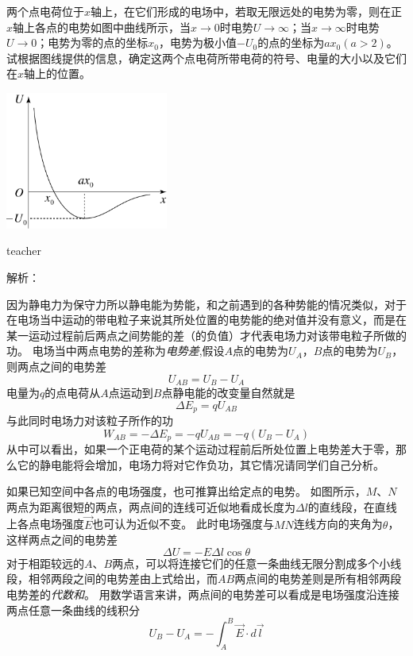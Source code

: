 \begin{example}
两个点电荷位于$x$轴上，在它们形成的电场中，若取无限远处的电势为零，则在正$x$轴上各点的电势如图中曲线所示，当$x\rightarrow 0$时电势$U\rightarrow \infty$；当$x\rightarrow \infty$时电势$U\rightarrow 0$；电势为零的点的坐标$x_0$，电势为极小值$-U_0$的点的坐标为$ax_0(a>2)$。
试根据图线提供的信息，确定这两个点电荷所带电荷的符号、电量的大小以及它们在$x$轴上的位置。
\begin{flushright}
\includegraphics[width=0.4\textwidth]{images/elec-problem-11.pdf}
\end{flushright}
\begin{taggedblock}{teacher}

解析：
\end{taggedblock}
\end{example}

因为静电力为保守力所以静电能为势能，和之前遇到的各种势能的情况类似，对于在电场当中运动的带电粒子来说其所处位置的电势能的绝对值并没有意义，而是在某一运动过程前后两点之间势能的差（的负值）才代表电场力对该带电粒子所做的功。
电场当中两点电势的差称为\emph{电势差},假设$A$点的电势为$U_A$，$B$点的电势为$U_B$，则两点之间的电势差
\begin{equation}
U_{AB}=U_B-U_A
\end{equation}
电量为$q$的点电荷从$A$点运动到$B$点静电能的改变量自然就是
\begin{equation}
\Delta E_p = qU_{AB}
\end{equation}
与此同时电场力对该粒子所作的功
\begin{equation}
W_{AB} = -\Delta E_p = -qU_{AB} = -q(U_B-U_A)
\end{equation}
从中可以看出，如果一个正电荷的某个运动过程前后所处位置上电势差大于零，那么它的静电能将会增加，电场力将对它作负功，其它情况请同学们自己分析。

如果已知空间中各点的电场强度，也可推算出给定点的电势。
如图所示，$M$、$N$两点为距离很短的两点，两点间的连线可近似地看成长度为$\Delta l$的直线段，在直线上各点电场强度$\vec{E}$也可认为近似不变。
此时电场强度与$MN$连线方向的夹角为$\theta$，这样两点之间的电势差
\begin{equation}
\Delta U = -E\Delta l \cos\theta
\end{equation}
对于相距较远的$A、B$两点，可以将连接它们的任意一条曲线无限分割成多个小线段，相邻两段之间的电势差由上式给出，而$AB$两点间的电势差则是所有相邻两段电势差的\emph{代数和}。
用数学语言来讲，两点间的电势差可以看成是电场强度沿连接两点任意一条曲线的线积分
\[U_B-U_A = -\int_A^B\vec{E}\cdot d\vec{l}\]

